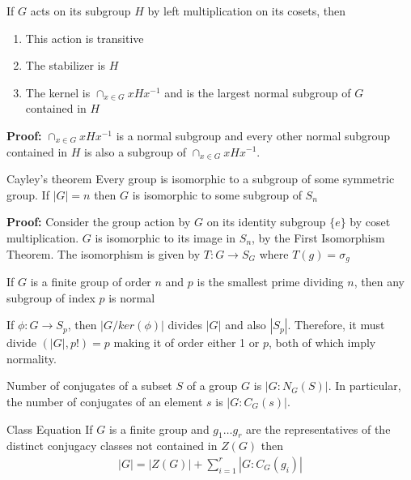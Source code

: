 \documentclass[titlepage, 12pt]{article}
\begin{document}
\begin{theorem}{}{}
    If $G$ acts on its subgroup $H$ by left multiplication on its cosets, then
    \begin{enumerate}
        \item This action is transitive
        \item The stabilizer is $H$
        \item The kernel is $\cap_{x\in G} xHx^{-1}$ and is the largest normal
            subgroup of $G$ contained in $H$
    \end{enumerate}
\end{theorem}
\textbf{Proof:} $\cap_{x\in G} xHx^{-1}$ is a normal subgroup and every other
normal subgroup contained in $H$ is also a subgroup of $\cap_{x\in G} xHx^{-1}$.

\begin{theorem}{Cayley's theorem}{}
    Every group is isomorphic to a subgroup of some symmetric group. If $|G| =
    n$ then $G$ is isomorphic to some subgroup of $S_n$
\end{theorem}
\textbf{Proof:} Consider the group action by $G$ on its identity subgroup $\{e\}$
by coset multiplication. $G$ is isomorphic to its image in $S_n$, by the First
Isomorphism Theorem. The isomorphism is given by $T:G\rightarrow S_G$ where
$T(g) = \sigma_g$

\begin{theorem}{}{}
    If $G$ is a finite group of order $n$ and $p$ is the smallest prime dividing
    $n$, then any subgroup of index $p$ is normal
\end{theorem}
If $\phi:G\rightarrow S_p$, then $|G/ker(\phi)|$ divides $|G|$ and also $|S_p|$.
Therefore, it must divide $(|G|, p!) = p$ making it of order either 1 or $p$,
both of which imply normality.

\begin{proposition}{}{}
    Number of conjugates of a subset $S$ of a group $G$ is $|G:N_G(S)|$. In
    particular, the number of conjugates of an element $s$ is $|G:C_G(s)|$.
\end{proposition}

\begin{theorem}{Class Equation}{}
    If $G$ is a finite group and $g_1\dots g_r$ are the representatives of the
    distinct conjugacy classes not contained in $Z(G)$ then
    \begin{gather*}
        |G| = |Z(G)| + \sum_{i = 1}^r |G : C_G(g_i)|
    \end{gather*}
\end{theorem}
\end{document}
